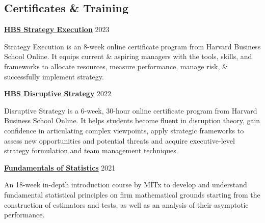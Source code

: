 \documentclass[margin,line]{res}
\begin{document}
\begin{resume}

\section{\sc Certificates \& Training}

{\bf \href{https://online.hbs.edu/courses/strategy-execution/}{HBS Strategy Execution}} \hfill {2023}\\
\vspace*{-3.5mm}
\begin{addmargin}[0pt]{.1\linewidth}
\vspace*{-1mm}
Strategy Execution is an 8-week online certificate program from Harvard Business School Online. It equips current \& aspiring managers with the tools, skills, and frameworks to allocate resources, measure performance, manage risk, \& successfully implement strategy. 
\end{addmargin}

\vspace*{-3mm}

{\bf \href{https://online.hbs.edu/courses/disruptive-strategy/}{HBS Disruptive Strategy}} \hfill {2022}\\
\vspace*{-3.5mm}
\begin{addmargin}[0pt]{.1\linewidth}
\vspace*{-1mm}
Disruptive Strategy is a 6-week, 30-hour online certificate program from Harvard Business School Online. It helps students become fluent in disruption theory, gain confidence in articulating complex viewpoints, apply strategic frameworks to assess new opportunities and potential threats and acquire executive-level strategy formulation and team management techniques. 
\end{addmargin}

\vspace*{-3mm}

{\bf \href{https://www.edx.org/course/fundamentals-of-statistics}{Fundamentals of Statistics}} \hfill {2021}\\
\vspace*{-3.5mm}
\begin{addmargin}[0pt]{.1\linewidth}
\vspace*{-1mm}
An 18-week in-depth introduction course by MITx to develop and understand fundamental statistical principles on firm mathematical grounds starting from the construction of estimators and tests, as well as an analysis of their asymptotic performance.
\end{addmargin}


\end{resume}
\end{document}
